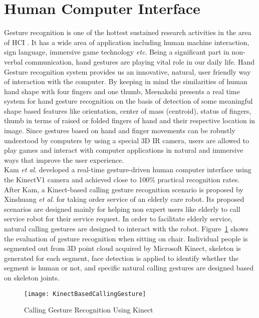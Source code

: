 \section{Human Computer Interface}
\indent
Gesture recognition is one of the hottest sustained research activities in the area of HCI \cite{NIRGesture14}. It has a wide area of application including human machine interaction, sign language, immersive game technology \textit{etc}. Being a significant part in non-verbal communication, hand gestures are playing vital role in our daily life. Hand Gesture recognition system provides us an innovative, natural, user friendly way of interaction with the computer. By keeping in mind the similarities of human hand shape with four fingers and one thumb, Meenakshi \cite{gestureRecognition12} presents a real time system for hand gesture recognition on the basis of detection of some meaningful shape based features like orientation, center of mass (centroid), status of fingers, thumb in terms of raised or folded fingers of hand and their respective location in image. Since gestures based on hand and finger movements can be robustly understood by computers by using a special 3D IR camera, users are allowed to play games and interact with computer applications in natural and immersive ways that improve the user experience. 
\\\indent
Kam \textit{et al}. \cite{KinectGesture12} developed a real-time gesture-driven human computer interface using the KinectV1 camera and achieved close to 100\% practical recognition rates. After Kam, a Kinect-based calling gesture recognition scenario is proposed by Xinshuang  \textit{et al}. \cite{gestureKinect14} for taking order service of an elderly care robot. Its proposed scenarios are designed mainly for helping non expert users like elderly to call service robot for their service request. In order to facilitate elderly service, natural calling gestures are designed to interact with the robot. Figure~\ref{KinectBasedCallingGesture} shows the evaluation of gesture recognition when sitting on chair. Individual people is segmented out from 3D point cloud acquired by Microsoft Kinect, skeleton is generated for each segment, face detection is applied to identify whether the segment is human or not, and specific natural calling gestures are designed based on skeleton joints. %
\begin{figure}[t]
\centering
\texttt{[image: KinectBasedCallingGesture]}
\caption{Calling Gesture Recognition Using Kinect \cite{gestureKinect14}}
\label{KinectBasedCallingGesture}
\end{figure}%
